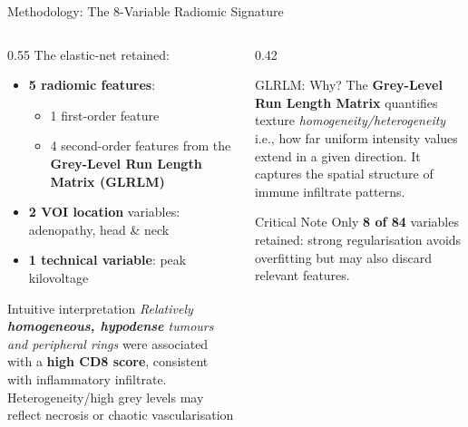 \documentclass[aspectratio=1610]{beamer}
\begin{document}
\begin{frame}{Methodology: The 8-Variable Radiomic Signature}
    \small
    \begin{columns}[T]
        \begin{column}{0.55\textwidth}
            The elastic-net retained:
            \begin{itemize}
                \small
                \item \textbf{5 radiomic features}:
                    \begin{itemize}
                        \item 1 first-order feature
                        \item 4 second-order features from the \textbf{Grey-Level Run Length Matrix (GLRLM)}
                    \end{itemize}
                \item \textbf{2 VOI location} variables: adenopathy, head \& neck
                \item \textbf{1 technical variable}: peak kilovoltage
            \end{itemize}
            \vspace{-0.2cm}
            \begin{exampleblock}{Intuitive interpretation}
                \small
                \textit{Relatively \textbf{homogeneous, hypodense} tumours and peripheral rings} were associated with a \textbf{high CD8 score}, consistent with inflammatory infiltrate. Heterogeneity/high grey levels may reflect necrosis or chaotic vascularisation
            \end{exampleblock}
        \end{column}
        \begin{column}{0.42\textwidth}
            \begin{alertblock}{GLRLM: Why?}
                The \textbf{Grey-Level Run Length Matrix} quantifies texture \textit{homogeneity/heterogeneity} i.e., how far uniform intensity values extend in a given direction. It captures the spatial structure of immune infiltrate patterns.
            \end{alertblock}
            \vspace{0.3em}
            \begin{alertblock}{Critical Note}
                Only \textbf{8 of 84} variables retained: strong regularisation avoids overfitting but may also discard relevant features.
            \end{alertblock}
        \end{column}
    \end{columns}
\end{frame}
\end{document}

